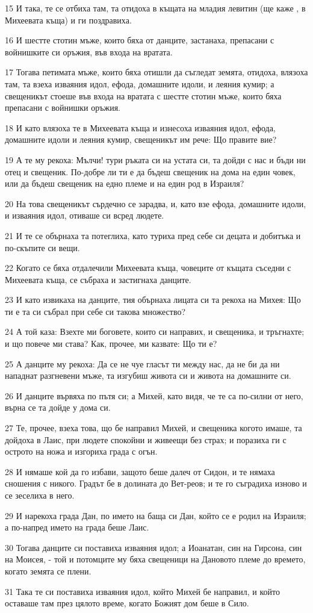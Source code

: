 \par 15 И така, те се отбиха там, та отидоха в къщата на младия левитин (ще каже , в Михеевата къща) и ги поздравиха.
\par 16 И шестте стотин мъже, които бяха от данците, застанаха, препасани с войнишките си оръжия, във входа на вратата.
\par 17 Тогава петимата мъже, които бяха отишли да съгледат земята, отидоха, влязоха там, та взеха изваяния идол, ефода, домашните идоли, и леяния кумир; а свещеникът стоеше във входа на вратата с шестте стотин мъже, които бяха препасани с войнишки оръжия.
\par 18 И като влязоха те в Михеевата къща и изнесоха изваяния идол, ефода, домашните идоли и леяния кумир, свещеникът им рече: Що правите вие?
\par 19 А те му рекоха: Мълчи! тури ръката си на устата си, та дойди с нас и бъди ни отец и свещеник. По-добре ли ти е да бъдеш свещеник на дома на един човек, или да бъдеш свещеник на едно племе и на един род в Израиля?
\par 20 На това свещеникът сърдечно се зарадва, и, като взе ефода, домашните идоли, и изваяния идол, отиваше си всред людете.
\par 21 И те се обърнаха та потеглиха, като туриха пред себе си децата и добитъка и по-скъпите си вещи.
\par 22 Когато се бяха отдалечили Михеевата къща, човеците от къщата съседни с Михеевата къща, се събраха и застигнаха данците.
\par 23 И като извикаха на данците, тия обърнаха лицата си та рекоха на Михея: Що ти е та си събрал при себе си такова множество?
\par 24 А той каза: Взехте ми боговете, които си направих, и свещеника, и тръгнахте; и що повече ми става? Как, прочее, ми казвате: Що ти е?
\par 25 А данците му рекоха: Да се не чуе гласът ти между нас, да не би да ни нападнат разгневени мъже, та изгубиш живота си и живота на домашните си.
\par 26 И данците вървяха по пътя си; а Михей, като видя, че те са по-силни от него, върна се та дойде у дома си.
\par 27 Те, прочее, взеха това, що бе направил Михей, и свещеника когото имаше, та дойдоха в Лаис, при людете спокойни и живеещи без страх; и поразиха ги с острото на ножа и изгориха града с огън.
\par 28 И нямаше кой да го избави, защото беше далеч от Сидон, и те нямаха сношения с никого. Градът бе в долината до Вет-реов; и те го съградиха изново и се зеселиха в него.
\par 29 И нарекоха града Дан, по името на баща си Дан, който се е родил на Израиля; а по-напред името на града беше Лаис.
\par 30 Тогава данците си поставиха изваяния идол; а Иоанатан, син на Гирсона, син на Моисея, - той и потомците му бяха свещеници на Дановото племе до времето, когато земята се плени.
\par 31 Така те си поставиха изваяния идол, който Михей бе направил, и който оставаше там през цялото време, когато Божият дом беше в Сило.

